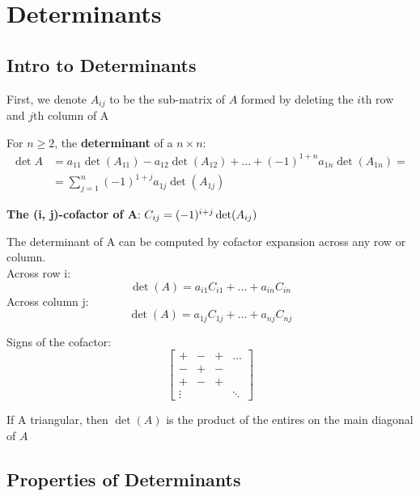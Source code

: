 \documentclass{report}
\begin{document}
\chapter{Determinants}
\section{Intro to Determinants}
\setcounter{theorem}{0}
\setcounter{definition}{0}

First, we denote $A_{ij}$ to be the sub-matrix of $A$ formed by deleting the $i$th row and $j$th column of A

\begin{definition}
For $n \ge 2$, the \textbf{determinant} of a $n \times n$: \[
\begin{array}{rlr}
    \det A &= a_{11} \det(A_{11}) - a_{12} \det(A_{12}) + \ldots + (-1)^{1+n} a_{1n} \det(A_{1n}) = \\    
    &= \sum_{j = 1}^{n}(-1)^{1+j}a_{1j}\det(A_{1j})
\end{array}
\]
\end{definition}

\textbf{The (i, j)-cofactor of A}: $C_{ij} = (-1)^{i+j}\det(A_{ij})$

\begin{theorem}
    The determinant of A can be computed by cofactor expansion across any row or column.\\
    Across row i:
    \[
    \det(A) = a_{i1}C_{i1} + \ldots + a_{in}C_{in}
    \]
    Across column j:
    \[
    \det(A) = a_{1j}C_{1j} + \ldots + a_{nj}C_{nj}
    \]
\end{theorem}

Signs of the cofactor:
\[
\begin{bmatrix}
    + & - & + & \ldots \\
    - & + & - & \\
    + & - & + & \\
    \vdots & & & \ddots
\end{bmatrix}
\]

\begin{theorem}
    If A triangular, then $\det(A)$ is the product of the entires on the main diagonal of $A$
\end{theorem}

\section{Properties of Determinants}
\end{document}
